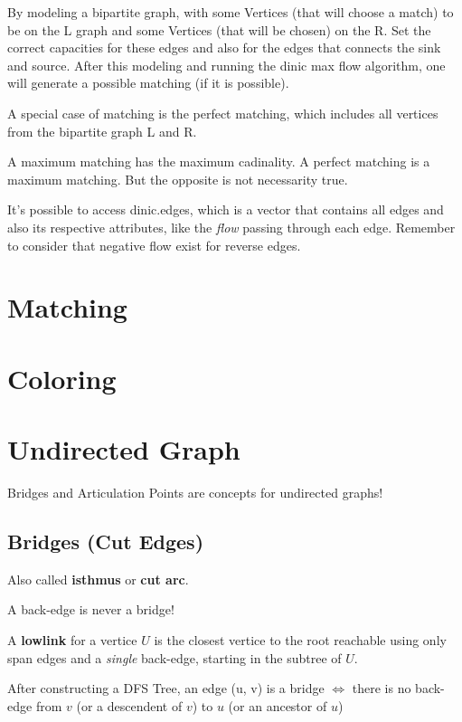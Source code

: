 	By modeling a bipartite graph, with some Vertices (that will choose a match) to be on the L graph and some Vertices (that will be chosen) on the R.
	Set the correct capacities for these edges and also for the edges that connects the sink and source. After this modeling
	and running the dinic max flow algorithm, one will generate a possible matching (if it is possible).

	A special case of matching is the perfect matching, which includes all vertices from the bipartite graph L and R.

	A maximum matching has the maximum cadinality. A perfect matching is a maximum matching. 
	But the opposite is not necessarity true.

	It's possible to access dinic.edges, which is a vector that contains all edges and also its respective attributes, 
	like the \textit{flow} passing through each edge. Remember to consider that negative flow exist for reverse edges.

\section{Matching}

\section{Coloring}

\section{Undirected Graph}

	Bridges and Articulation Points are concepts for undirected graphs!
	
	\subsection{Bridges (Cut Edges)}

		Also called \textbf{isthmus} or \textbf{cut arc}.
		
		A back-edge is never a bridge!
		
		A \textbf{lowlink} for a vertice $U$ is the closest vertice to the root reachable using only span edges and a \textit{single} back-edge, starting in the subtree of $U$.
		
		After constructing a DFS Tree, an edge (u, v) is a bridge $\iff$ there is no back-edge from $v$ (or a descendent of $v$) to $u$ (or an ancestor of $u$)
		
